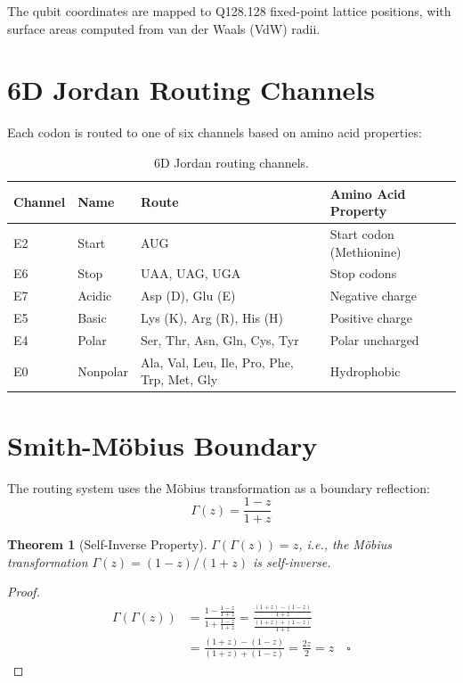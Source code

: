 \documentclass[11pt]{article}
\newtheorem{theorem}{Theorem}
\begin{document}
The qubit coordinates are mapped to Q128.128 fixed-point lattice positions, with surface areas computed from van der Waals (VdW) radii.

\section{6D Jordan Routing Channels}

Each codon is routed to one of six channels based on amino acid properties:

\begin{table}[ht]
\centering
\caption{6D Jordan routing channels.}
\label{tab:channels}
\begin{tabular}{lllp{6cm}}
\toprule
Channel & Name & Route & Amino Acid Property \\
\midrule
E2 & Start & AUG & Start codon (Methionine) \\
E6 & Stop & UAA, UAG, UGA & Stop codons \\
E7 & Acidic & Asp (D), Glu (E) & Negative charge \\
E5 & Basic & Lys (K), Arg (R), His (H) & Positive charge \\
E4 & Polar & Ser, Thr, Asn, Gln, Cys, Tyr & Polar uncharged \\
E0 & Nonpolar & Ala, Val, Leu, Ile, Pro, Phe, Trp, Met, Gly & Hydrophobic \\
\bottomrule
\end{tabular}
\end{table}

\section{Smith-M\"obius Boundary}

The routing system uses the M\"obius transformation as a boundary reflection:
\begin{equation}
\Gamma(z) = \frac{1 - z}{1 + z}
\end{equation}

\begin{theorem}[Self-Inverse Property]
$\Gamma(\Gamma(z)) = z$, i.e., the M\"obius transformation $\Gamma(z) = (1-z)/(1+z)$ is self-inverse.
\end{theorem}

\begin{proof}
\begin{align*}
\Gamma(\Gamma(z)) &= \frac{1 - \frac{1-z}{1+z}}{1 + \frac{1-z}{1+z}} = \frac{\frac{(1+z) - (1-z)}{1+z}}{\frac{(1+z) + (1-z)}{1+z}} \\
&= \frac{(1+z) - (1-z)}{(1+z) + (1-z)} = \frac{2z}{2} = z \quad \square
\end{align*}
\end{proof}
\end{document}
